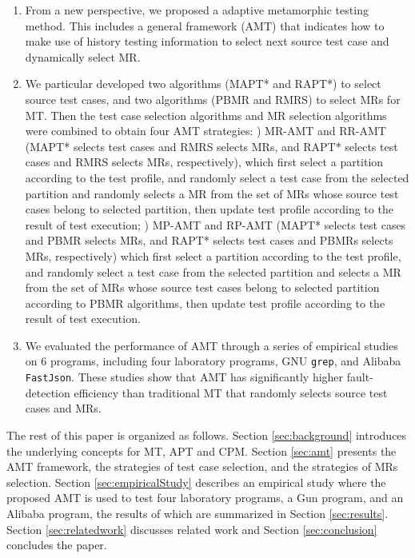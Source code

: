 \documentclass[10pt,journal,compsoc]{IEEEtran}
\newcommand{\rmnum}[1]{\expandafter{\romannumeral #1\relax}}
\begin{document}
\begin{enumerate}[1]
  \item
  From a new perspective, we proposed a adaptive metamorphic testing method. This includes a general framework (AMT) that indicates how to make use of history testing information to select next source test case and dynamically select MR.
  \item
  We particular developed two algorithms (MAPT* and RAPT*) to select source test cases, and two algorithms (PBMR and RMRS) to select MRs for MT. Then the test case selection algorithms and MR selection algorithms were combined to obtain four AMT strategies: \rmnum{1}) MR-AMT and RR-AMT (MAPT* selects test cases and RMRS selects MRs, and RAPT* selects test cases and RMRS selects MRs, respectively), which first select a partition according to the test profile, and randomly select a test case from the selected partition and randomly selects a MR from the set of MRs whose source test cases belong to selected partition, then update test profile according to the result of test execution; \rmnum{2}) MP-AMT and RP-AMT (MAPT* selects test cases and PBMR selects MRs, and RAPT* selects test cases and PBMRs selects MRs, respectively) which first select a partition according to the test profile, and randomly select a test case from the selected partition and selects a MR from the set of MRs whose source test cases belong to selected partition according to PBMR algorithms, then update test profile according to the result of test execution.
  \item
  We evaluated the performance of AMT through a series of empirical studies on 6 programs, including four laboratory programs, GNU \texttt{grep}, and Alibaba \texttt{FastJson}. These studies show that AMT has significantly higher fault-detection efficiency than traditional MT that randomly selects source test cases and MRs.

\end{enumerate}


The rest of this paper is organized as follows.
Section \ref{sec:background} introduces the underlying concepts for MT, APT and CPM.
Section \ref{sec:amt} presents the AMT framework, the strategies of test case selection, and the strategies of MRs selection.
Section \ref{sec:empiricalStudy} describes an empirical study where the proposed AMT is used to test four laboratory programs, a Gun program, and an Alibaba program, the results of which are summarized in Section \ref{sec:results}.
Section \ref{sec:relatedwork} discusses related work and Section \ref{sec:conclusion} concludes the paper.
\end{document}
